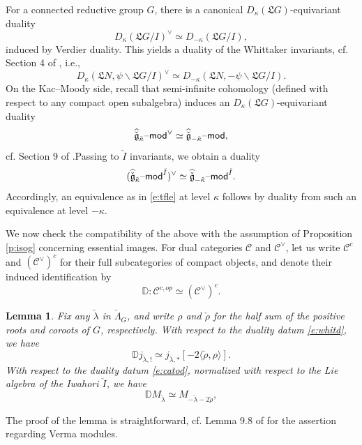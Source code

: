 \documentclass[11pt,reqno]{amsart}
\newcommand{\cgk}{\widehat{\check{\mathfrak{g}}}_{\check{\kappa}}}
\newcommand{\fL}{\mathfrak{L}}
\newcommand{\scc}{\mathscr{C}}
\newtheorem{lem}[subsubsection]{Lemma}
\theoremstyle{remark}
\numberwithin{equation}{section}
\renewcommand{\mod}{\text{\textendash}\mathsf{mod}}
\begin{document}
For a connected reductive group $G$, there is a canonical 
$D_\kappa(\fL G)$-equivariant 
duality 
%
\[ D_\kappa(\fL G / I)^\vee \simeq D_{-\kappa}(\fL G / I),
\]
%
induced by Verdier duality. This yields a duality of the 
Whittaker invariants, cf. Section 4 of \cite{lpw}, i.e., 
%
\begin{equation} \label{e:whitd}  D_\kappa(\fL N, \psi \backslash 
\fL G / 
I)^\vee \simeq D_{-\kappa}(\fL N, 
-\psi \backslash \fL G / I).
\end{equation}
%
On the Kac--Moody side, recall that semi-infinite 
cohomology (defined with respect to any compact open subalgebra) induces an 
$D_\kappa(\fL G)$-equivariant duality 
%
\[ \cgk\mod^\vee \simeq 
\widehat{\check{\mathfrak{g}}}_{-\check{\kappa}}\mod, \]
%
cf. Section 9 of \cite{mys}.Passing to $\check{I}$ invariants, we 
obtain a duality 
% 
\begin{equation} \label{e:catod} (\cgk\mod^{\check{I}})^\vee \simeq 
\widehat{\check{\mathfrak{g}}}_{-\check{\kappa}}\mod^{\check{I}}. 
\end{equation}
%
Accordingly, an equivalence as in \eqref{e:tfle} at level $\kappa$ 
follows by duality from such an equivalence at level $-\kappa$.   

We now check the compatibility of the above with the assumption of Proposition 
\ref{p:isog} concerning essential images. For dual categories $\scc$ and 
$\scc^\vee$, let us write $\scc^c$ and $(\scc^\vee)^c$ for their full 
subcategories of compact objects, and denote their induced identification by 
%
\[ \mathbb{D}: \scc^{c, op} \simeq (\scc^\vee)^c. \]
%

\begin{lem} Fix any $\check{\lambda}$ in $\check{\Lambda}_G$, and write $\rho$ 
	and $\check{\rho}$ for the half sum of the positive roots and coroots of 
	$G$, 
	respectively. With respect to 
	the duality datum \eqref{e:whitd}, we have
	\[ \mathbb{D} j_{\check{\lambda}, !} \simeq j_{\check{\lambda}, *} [-2 
	\langle \check{\rho}, \rho \rangle].\]
	\noindent With respect to the duality datum \eqref{e:catod}, normalized 
	with 
	respect to 
	the Lie algebra of the Iwahori $\check{I}$, we have 
	\[ \mathbb{D} M_{\check{\lambda}} \simeq M_{- \check{\lambda} - 2 
		\check{\rho}}, \]
	
\end{lem}

The proof of the lemma is straightforward, cf. Lemma 9.8 of \cite{lpw} for the 
assertion regarding Verma modules. 








%
\end{document}
